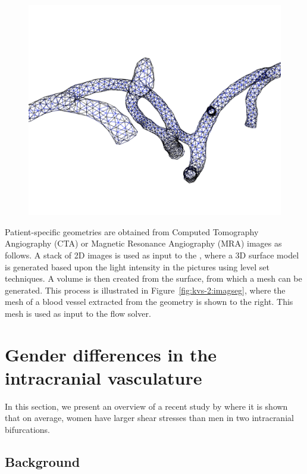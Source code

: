 \begin{figure}
{            \includegraphics[width=\threefigsfull]{chapters/kvs-2/pdf/viper3.pdf}}
\end{figure}

Patient-specific geometries are obtained from Computed Tomography
Angiography (CTA) or Magnetic Resonance Angiography (MRA) images as
follows. A stack of 2D images is used as input to the \citet{vmtk},
where a 3D surface model is generated based upon the light intensity
in the pictures using level set techniques. A volume is then created
from the surface, from which a mesh can be generated. This process is
illustrated in Figure~\ref{fig:kvs-2:imagseg}, where the mesh of a
blood vessel extracted from the geometry is shown to the right. This
mesh is used as input to the flow solver.

\section{Gender differences in the intracranial vasculature} \label{gender}

In this section, we present an overview of a recent study
by \citet{LindekleivValen-SendstadMorganEtAl2010} where it is shown
that on average, women have larger shear stresses than men in two
intracranial bifurcations.

\subsection{Background}

